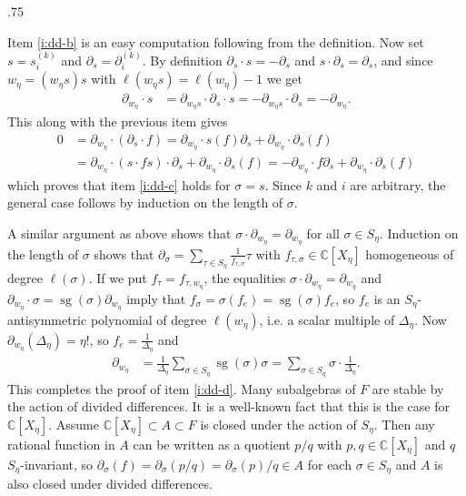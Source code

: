 \documentclass[11pt,fleqn]{article}
\makeatletter
\renewenvironment{proof}[1][\textit{Proof}]{\par
  \pushQED{\qed}%
  \normalfont \topsep.75\paraskip\relax
  \trivlist
  \item[\hskip\labelsep
        \itshape
    #1\@addpunct{.}]\ignorespaces
}{%
  \popQED\endtrivlist\@endpefalse
}
\newcommand\CC{\mathbb C}
\DeclareMathOperator\sg{sg}
\makeatother
\begin{document}
\begin{proof}
Item \ref{i:dd-b} is an easy computation following from the definition. Now set
$s = s_i^{(k)}$ and $\partial_s = \partial_{i}^{(k)}$. By definition 
$\partial_s \cdot s = - \partial_s$ and $s \cdot \partial_s = \partial_s$, and
since $w_\eta = (w_\eta s) s$ with $\ell(w_\eta s) = \ell(w_\eta) - 1$ we get
\begin{align*}
\partial_{w_\eta} \cdot s 
  &= \partial_{w_\eta s} \cdot \partial_s \cdot s
  = - \partial_{w_\eta s} \cdot \partial_s = - \partial_{w_\eta}.
\end{align*}
This along with the previous item gives
\begin{align*}
0 
  &= \partial_{w_\eta} \cdot (\partial_s \cdot f)
  = \partial_{w_\eta} \cdot s(f) \partial_s + \partial_{w_\eta} \cdot 
    \partial_s(f)\\
  &= \partial_{w_\eta} \cdot (s \cdot f s) \cdot \partial_s + 
    \partial_{w_\eta} \cdot \partial_s(f)
  = - \partial_{w_\eta} \cdot f \partial_s + \partial_{w_\eta} \cdot 
    \partial_s(f)
\end{align*}
which proves that item \ref{i:dd-c} holds for $\sigma = s$. Since $k$ and $i$
are arbitrary, the general case follows by induction on the length of $\sigma$.

A similar argument as above shows that $\sigma \cdot \partial_{w_\eta} = 
\partial_{w_\eta}$ for all $\sigma \in S_\eta$. Induction on the length 
of $\sigma$ shows that $\partial_\sigma = \sum_{\tau \in S_\eta} 
\frac{1}{f_{\tau,\sigma}} \tau$ with $f_{\tau,\sigma} \in \CC[X_\eta]$ 
homogeneous of degree $\ell(\sigma)$. If we put $f_\tau = f_{\tau, w_\eta}$, 
the equalities $\sigma \cdot \partial_{w_\eta} = \partial_{w_\eta}$ and 
$\partial_{w_\eta} \cdot \sigma = \sg(\sigma) \partial_{w_\eta}$ imply that 
$f_\sigma = \sigma(f_e) = \sg(\sigma) f_e$, so $f_e$ is an 
$S_\eta$-antisymmetric polynomial of degree $\ell(w_\eta)$, i.e. a scalar 
multiple of $\Delta_\eta$. Now $\partial_{w_\eta}(\Delta_\eta) = \eta!$, so 
$f_e = \frac{1}{\Delta_\eta}$ and
\begin{align*}
\partial_{w_\eta} 
  &= \frac{1}{\Delta_\eta} \sum_{\sigma \in S_\eta} \sg(\sigma) \sigma
  = \sum_{\sigma \in S_\eta} \sigma \cdot \frac{1}{\Delta_\eta}.
\end{align*}
This completes the proof of item \ref{i:dd-d}.
\end{proof}
Many subalgebras of $F$ are stable by the action of divided differences.
It is a well-known fact that this is the case for $\CC[X_\eta]$. Assume 
$\CC[X_\eta] \subset A \subset F$ is closed under the action of $S_\eta$. 
Then any rational function in $A$ can be written as a quotient $p/q$ with 
$p,q \in \CC[X_\eta]$ and $q$ $S_\eta$-invariant, so $\partial_\sigma(f) = 
\partial_\sigma(p/q) = \partial_\sigma(p)/q \in A$ for each $\sigma \in 
S_\eta$ and $A$ is also closed under divided differences.
\end{document}
